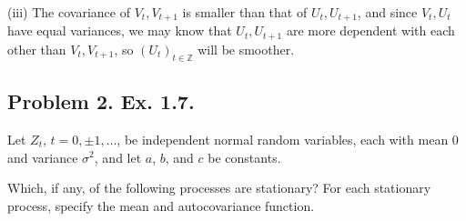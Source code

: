 \documentclass[lang=en,11pt,a4paper,citestyle =authoryear]{elegantpaper}
\begin{document}
(iii) The covariance of $V_t, V_{t+1}$ is smaller than that of $U_t, U_{t+1}$, and since $V_t,U_t$ have equal variances, we may know that $U_t,U_{t+1}$ are more dependent with each other than $V_t,V_{t+1}$, so $(U_t)_{t\in\mathbb{Z}}$ will be smoother.
\par 
\vspace{0.5em}

\subsection*{Problem 2. Ex. 1.7.} 

Let $Z_t$, $t=0,\pm1,\ldots$, be independent normal random variables,
each with mean $0$ and variance $\sigma^2$, and let $a$, $b$, and $c$
be constants.

Which, if any, of the following processes are stationary? For each
stationary process, specify the mean and autocovariance function.
\end{document}
